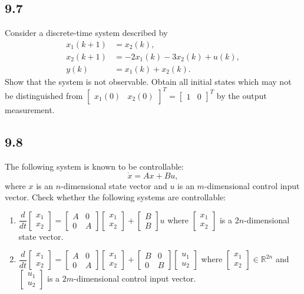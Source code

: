 \documentclass{article}
\newcommand{\problem}[2]{\subsection*{#1}}
\begin{document}
\problem{9.7}{}
Consider a discrete-time system described by
\[
\begin{aligned}
x_1(k + 1) &= x_2(k), \\
x_2(k + 1) &= -2x_1(k) - 3x_2(k) + u(k), \\
y(k) &= x_1(k) + x_2(k).
\end{aligned}
\]
Show that the system is not observable. Obtain all initial states which may not be distinguished from $\begin{bmatrix} x_1(0) & x_2(0) \end{bmatrix}^T = \begin{bmatrix} 1 & 0 \end{bmatrix}^T$ by the output measurement.

\problem{9.8}{}
The following system is known to be controllable:
\[
\dot{x} = Ax + Bu,
\]
where $x$ is an $n$-dimensional state vector and $u$ is an $m$-dimensional control input vector. Check whether the following systems are controllable:
\begin{enumerate}
\item $\dfrac{d}{dt}\begin{bmatrix} x_1 \\ x_2 \end{bmatrix} = \begin{bmatrix} A & 0 \\ 0 & A \end{bmatrix}\begin{bmatrix} x_1 \\ x_2 \end{bmatrix} + \begin{bmatrix} B \\ B \end{bmatrix} u$ where $\begin{bmatrix} x_1 \\ x_2 \end{bmatrix}$ is a $2n$-dimensional state vector.
\item $\dfrac{d}{dt}\begin{bmatrix} x_1 \\ x_2 \end{bmatrix} = \begin{bmatrix} A & 0 \\ 0 & A \end{bmatrix}\begin{bmatrix} x_1 \\ x_2 \end{bmatrix} + \begin{bmatrix} B & 0 \\ 0 & B \end{bmatrix}\begin{bmatrix} u_1 \\ u_2 \end{bmatrix}$ where $\begin{bmatrix} x_1 \\ x_2 \end{bmatrix} \in \mathbb{R}^{2n}$ and $\begin{bmatrix} u_1 \\ u_2 \end{bmatrix}$ is a $2m$-dimensional control input vector.
\end{enumerate}
\end{document}
